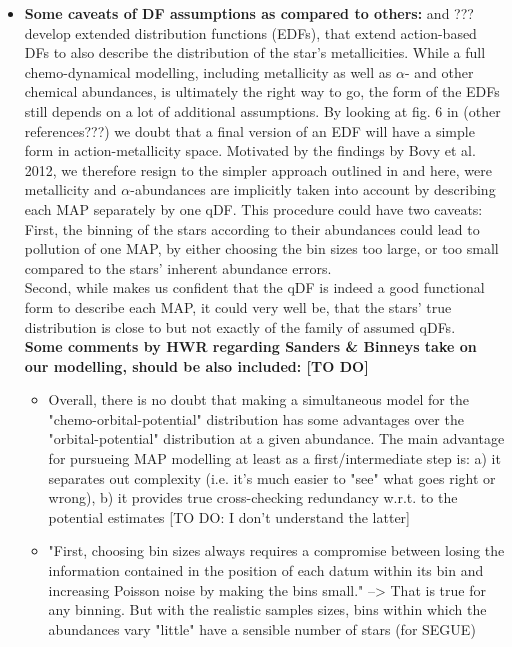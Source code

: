 \begin{itemize}
\item \textbf{Some caveats of DF assumptions as compared to others:} \cite{san15} and ??? develop extended distribution functions (EDFs), that extend action-based DFs to also describe the distribution of the star's metallicities. While a full chemo-dynamical modelling,  including metallicity as well as $\alpha$- and other chemical abundances, is ultimately the right way to go, the form of the EDFs still depends on a lot of additional assumptions. By looking at fig. 6 in \cite{bov13} (other references???) we doubt that a final version of an EDF will have a simple form in action-metallicity space. Motivated by the findings by Bovy et al. 2012, we therefore resign to the simpler approach outlined in \cite{bov13} and here, were metallicity and $\alpha$-abundances are implicitly taken into account by describing each MAP separately by one qDF. This procedure could have two caveats: 
\\First, the binning of the stars according to their abundances could lead to pollution of one MAP, by either choosing the bin sizes too large, or too small compared to the stars' inherent abundance errors. 
\\Second, while \citet{tin13} makes us confident that the qDF is indeed a good functional form to describe each MAP, it could very well be, that the stars' true distribution is close to but not exactly of the family of assumed qDFs. 
\\\textbf{Some comments by HWR regarding Sanders \& Binneys take on our modelling, should be also included: [TO DO]} 
\begin{itemize}
\item Overall, there is no doubt that making a simultaneous model for the "chemo-orbital-potential" distribution has some advantages over the "orbital-potential" distribution at a given abundance. The main advantage for pursueing MAP modelling at least as a first/intermediate step is: a) it separates out complexity (i.e. it's much easier to "see" what goes right or wrong), b) it provides true cross-checking redundancy w.r.t. to the potential estimates [TO DO: I don't understand the latter]
\item "First, choosing bin sizes always requires a compromise between losing the information contained in the position of each datum within its bin and increasing Poisson noise by making the bins small." --> That is true for any binning. But with the realistic samples sizes, bins within which the abundances vary "little" have a sensible number of stars (for SEGUE)

\end{itemize}
\end{itemize}
